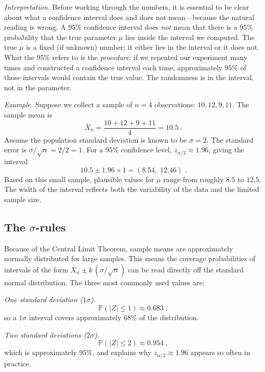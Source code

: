 \medskip

\textit{Interpretation.} Before working through the numbers, it is essential to be clear about what a confidence interval does and does not mean---because the natural reading is wrong. A $95\%$ confidence interval does \textit{not} mean that there is a $95\%$ probability that the true parameter $\mu$ lies inside the interval we computed. The true $\mu$ is a fixed (if unknown) number; it either lies in the interval or it does not. What the $95\%$ refers to is the \textit{procedure}: if we repeated our experiment many times and constructed a confidence interval each time, approximately $95\%$ of those intervals would contain the true value. The randomness is in the interval, not in the parameter.

\medskip

\textit{Example.} Suppose we collect a sample of $n = 4$ observations: $10, 12, 9, 11$. The sample mean is
\[
    \bar{X}_n = \frac{10 + 12 + 9 + 11}{4} = 10.5 \; .
\]
Assume the population standard deviation is known to be $\sigma = 2$. The standard error is $\sigma/\sqrt{n} = 2/2 = 1$. For a $95\%$ confidence level, $z_{\alpha/2} \approx 1.96$, giving the interval
\[
    10.5 \pm 1.96 \times 1 = (8.54,\; 12.46) \; .
\]
Based on this small sample, plausible values for $\mu$ range from roughly $8.5$ to $12.5$. The width of the interval reflects both the variability of the data and the limited sample size.

\subsection*{The \texorpdfstring{$\sigma$}{sigma}-rules}

Because of the Central Limit Theorem, sample means are approximately normally distributed for large samples. This means the coverage probabilities of intervals of the form $\bar{X}_n \pm k\,(\sigma/\sqrt{n})$ can be read directly off the standard normal distribution. The three most commonly used values are:

\medskip

\textit{One standard deviation ($1\sigma$).}
\[
    \mathbb{P}(|Z| \leq 1) \approx 0.683 \; ,
\]
so a $1\sigma$ interval covers approximately $68\%$ of the distribution.

\medskip

\textit{Two standard deviations ($2\sigma$).}
\[
    \mathbb{P}(|Z| \leq 2) \approx 0.954 \; ,
\]
which is approximately $95\%$, and explains why $z_{\alpha/2} \approx 1.96$ appears so often in practice.

